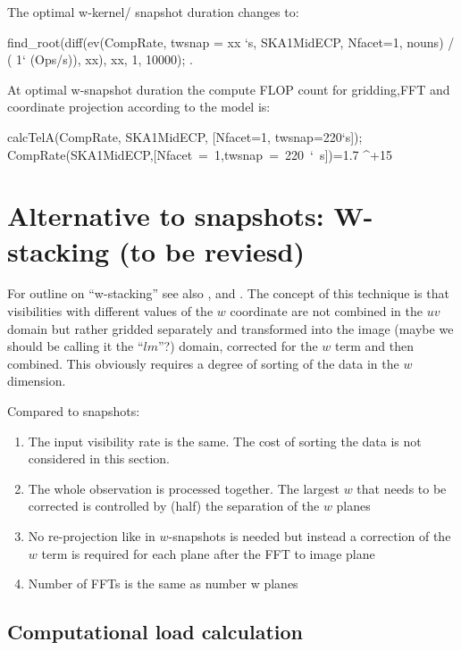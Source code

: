 \documentclass[useAMS,usenatbib,referee]{article}
\begin{document}
The optimal w-kernel/ snapshot duration changes to:

\begin{maxima}[]
  find_root(diff(ev(CompRate, twsnap = xx `s, SKA1MidECP, Nfacet=1, nouns) / ( 1` (Ops/s)), xx), xx, 1, 10000);
\maximaoutput*
{}. \\
\end{maxima}

At optimal w-snapshot duration the compute FLOP count for gridding,FFT
and coordinate projection according to the model is:
\begin{maxima}[]
calcTelA(CompRate, SKA1MidECP, [Nfacet=1, twsnap=220`s]);
\maximaoutput*
\m  \mbox{{}CompRate(SKA1MidECP,[Nfacet = 1,twsnap = 220 ` s]){}}=1.7 ^{+15} \\
\end{maxima}


\section{Alternative to snapshots: W-stacking (to be reviesd)} 

For outline on ``w-stacking'' see also
\cite{VoronkovCalim2010Gridding}, and \cite{2013A&A...553A.105T}. The
concept of this technique is that visibilities with different values
of the $w$ coordinate are not combined in the $uv$ domain but rather
gridded separately and transformed into the image (maybe we should be
calling it the ``$lm$''?) domain, corrected for the $w$ term and then
combined. This obviously requires a degree of sorting of the data in
the $w$ dimension.

Compared to snapshots:
\begin{enumerate}
  \item The input visibility rate is the same. The cost of sorting the
    data is not considered in this section.
  \item The whole observation is processed together. The largest $w$
    that needs to be corrected is controlled by (half) the separation
    of the $w$ planes
  \item No re-projection like in $w$-snapshots is needed but instead a
    correction of the $w$ term is required for each plane after the
    FFT to image plane
  \item Number of FFTs is the same as number w planes
\end{enumerate}

\subsection{Computational load calculation}
\end{document}
